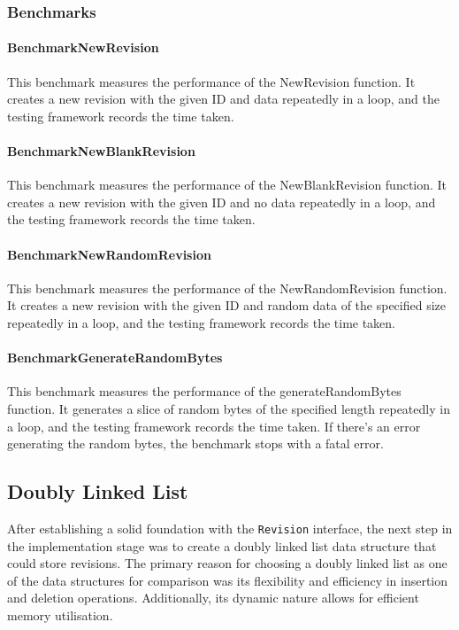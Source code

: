 \subsubsection{Benchmarks}
\paragraph{BenchmarkNewRevision}
This benchmark measures the performance of the NewRevision function. It creates a new revision with the given ID and data repeatedly in a loop, and the testing framework records the time taken.

\paragraph{BenchmarkNewBlankRevision}
This benchmark measures the performance of the NewBlankRevision function. It creates a new revision with the given ID and no data repeatedly in a loop, and the testing framework records the time taken.

\paragraph{BenchmarkNewRandomRevision}
This benchmark measures the performance of the NewRandomRevision function. It creates a new revision with the given ID and random data of the specified size repeatedly in a loop, and the testing framework records the time taken.

\paragraph{BenchmarkGenerateRandomBytes}
This benchmark measures the performance of the generateRandomBytes function. It generates a slice of random bytes of the specified length repeatedly in a loop, and the testing framework records the time taken. If there's an error generating the random bytes, the benchmark stops with a fatal error.

\subsection{Doubly Linked List}
After establishing a solid foundation with the \lstinline{Revision} interface, the next step in the implementation stage was to create a doubly linked list data structure that could store revisions. The primary reason for choosing a doubly linked list as one of the data structures for comparison was its flexibility and efficiency in insertion and deletion operations. Additionally, its dynamic nature allows for efficient memory utilisation.
\smallskip

